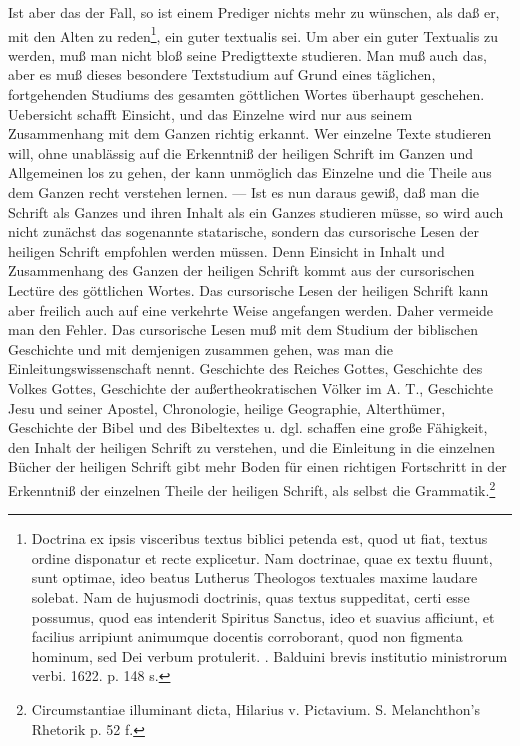 Ist aber das der Fall, so ist einem Prediger nichts mehr zu wünschen, als daß er, mit den Alten zu reden\footnote{Doctrina ex ipsis visceribus textus biblici petenda est, quod ut fiat, textus ordine disponatur et recte explicetur. Nam doctrinae, quae ex textu fluunt, sunt optimae, ideo beatus Lutherus Theologos textuales maxime laudare solebat. Nam de hujusmodi doctrinis, quas textus suppeditat, certi esse possumus, quod eas intenderit Spiritus Sanctus, ideo et suavius afficiunt, et facilius arripiunt animumque docentis corroborant, quod non figmenta hominum, sed Dei verbum protulerit. . Balduini brevis institutio ministrorum verbi. 1622. p. 148 s.}, ein guter textualis sei. Um aber ein guter Textualis zu werden, muß man nicht bloß seine Predigttexte studieren. Man muß auch das, aber es muß dieses besondere Textstudium auf Grund eines täglichen, fortgehenden Studiums des gesamten göttlichen Wortes überhaupt geschehen. Uebersicht schafft Einsicht, und das Einzelne wird nur aus seinem Zusammenhang mit dem Ganzen richtig erkannt. Wer einzelne Texte studieren will, ohne unablässig auf die Erkenntniß der heiligen Schrift im Ganzen und Allgemeinen los zu gehen, der kann unmöglich das Einzelne und die Theile aus dem Ganzen recht verstehen lernen. — Ist es nun daraus gewiß, daß man die Schrift als Ganzes und ihren Inhalt als ein Ganzes studieren müsse, so wird auch nicht zunächst das sogenannte statarische, sondern das cursorische Lesen der heiligen Schrift empfohlen werden müssen. Denn Einsicht in Inhalt und Zusammenhang des Ganzen der heiligen Schrift
kommt aus der cursorischen Lectüre des göttlichen Wortes. Das cursorische Lesen der heiligen Schrift kann aber freilich auch auf eine verkehrte Weise angefangen werden. Daher vermeide man den Fehler. Das cursorische Lesen muß mit dem Studium der biblischen Geschichte und mit demjenigen zusammen gehen, was man die Einleitungswissenschaft nennt. Geschichte des Reiches Gottes, Geschichte des Volkes Gottes, Geschichte der außertheokratischen Völker im A. T., Geschichte Jesu und seiner Apostel, Chronologie, heilige Geographie, Alterthümer, Geschichte der Bibel und des Bibeltextes u. dgl. schaffen eine große Fähigkeit, den Inhalt der heiligen Schrift zu verstehen, und die Einleitung in die einzelnen Bücher der heiligen Schrift gibt mehr Boden für einen richtigen Fortschritt in der Erkenntniß der einzelnen Theile der heiligen Schrift, als selbst die Grammatik.\footnote{Circumstantiae illuminant dicta, Hilarius v. Pictavium. S. Melanchthon’s Rhetorik p. 52 f.}

